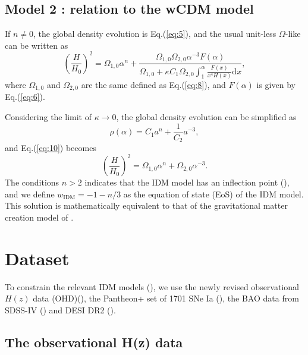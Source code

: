 \documentclass[twocolumn]{aastex631}
\begin{document}
\subsection{Model 2 : relation to the wCDM model}

   If $n\neq0$, the global density evolution is Eq.(\ref{eq:5}), and the 
   usual unit-less $\Omega$-like can be written as
   \begin{equation}
      \left(\frac{H}{H_0}\right)^2 = \Omega_{1,0} \alpha^n + 
      \frac{\Omega_{1,0} \Omega_{2,0} \alpha^{-3}F(\alpha)}
      {\Omega_{1,0} + \kappa C_1 \Omega_{2,0} \int_1^\alpha 
      \frac{F(x)}{x^4 H(x)} \mathrm{d}x},
      \label{eq:10}
   \end{equation}
   where $\Omega_{1,0}$ and $\Omega_{2,0}$ are the same defined as Eq.(\ref{eq:8}), and 
   $F(\alpha)$ is given by Eq.(\ref{eq:6}).

   Considering the limit of $\kappa \to0$, the global density evolution can be
   simplified as
   \begin{equation}
      \rho(\alpha)=C_1 a^{n}+\frac{1}{C_2} a^{-3},
      \label{eq:11}
   \end{equation}
   and Eq.(\ref{eq:10}) becomes
   \begin{equation}
      \left(\frac{H}{H_0}\right)^2=\Omega_{1,0}\alpha^{n}+\Omega_{2,0}\alpha^{-3}.
      \label{eq:12}
   \end{equation}
   The conditions $n>2$ indicates that the IDM model has an inflection point (\cite{Basilakos_2009}),
   and we define $w_{\text{IDM}}=-1-n/3$ as the equation of state (EoS) of the IDM model.
   This solution is mathematically equivalent to that of the gravitational matter 
   creation model of \cite{Lima_2008}.
   
\section{Dataset}\label{sec:3}

   To constrain the relevant IDM models (\cite{Basilakos_2009}), we use the newly revised
   observational $H(z)$ data (OHD)(\cite{PhysRevD.71.123001, Daniel.Stern_2010, 
   M.Moresco_2012, Zhang_2014, Moresco_2016, 10.1093/mnras/stx301, 10.1093/mnrasl/slv037, 
   Borghi_2022, Jiao_2023}), the Pantheon+ set of 1701 SNe Ia 
   (\cite{Scolnic_2022}), the BAO data from SDSS-IV (\cite{PhysRevD.103.083533}) and DESI DR2 
   (\cite{desicollaboration2025desidr2resultsii}).

\subsection{The observational H(z) data}
\end{document}
